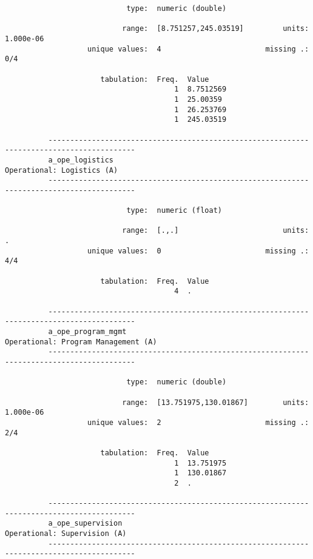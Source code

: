 \documentclass{article}
\begin{document}
\begin{verbatim}
                            type:  numeric (double)
          
                           range:  [8.751257,245.03519]         units:  1.000e-06
                   unique values:  4                        missing .:  0/4
          
                      tabulation:  Freq.  Value
                                       1  8.7512569
                                       1  25.00359
                                       1  26.253769
                                       1  245.03519
          
          ------------------------------------------------------------------------------------------
          a_ope_logistics                                                 Operational: Logistics (A)
          ------------------------------------------------------------------------------------------
          
                            type:  numeric (float)
          
                           range:  [.,.]                        units:  .
                   unique values:  0                        missing .:  4/4
          
                      tabulation:  Freq.  Value
                                       4  .
          
          ------------------------------------------------------------------------------------------
          a_ope_program_mgmt                                     Operational: Program Management (A)
          ------------------------------------------------------------------------------------------
          
                            type:  numeric (double)
          
                           range:  [13.751975,130.01867]        units:  1.000e-06
                   unique values:  2                        missing .:  2/4
          
                      tabulation:  Freq.  Value
                                       1  13.751975
                                       1  130.01867
                                       2  .
          
          ------------------------------------------------------------------------------------------
          a_ope_supervision                                             Operational: Supervision (A)
          ------------------------------------------------------------------------------------------
          

\end{verbatim}
\end{document}

